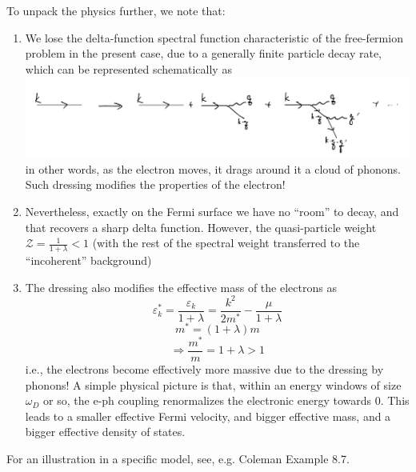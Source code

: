 To unpack the physics further, we note that:
\begin{enumerate}
    \item We lose the delta-function spectral function characteristic of the free-fermion problem in the present case, due to a generally finite particle decay rate, which can be represented schematically as
    \includegraphics[width=\textwidth]{jupyterbook/data/fig/lec24-fig04.png}
    in other words, as the electron moves, it drags around it a cloud of phonons. Such dressing modifies the properties of the electron!
    \item Nevertheless, exactly on the Fermi surface we have no ``room'' to decay, and that recovers a sharp delta function. However, the quasi-particle weight $\mathcal{Z}=\frac{1}{1+\lambda}<1$ (with the rest of the spectral weight transferred to the ``incoherent'' background)
    \item The dressing also modifies the effective mass of the electrons as
    \[ \varepsilon _{k}^{*}=\frac{\varepsilon _k}{1+\lambda}=\frac{k^2}{2m^*}-\frac{\mu}{1+\lambda}\]
    \[ m^*=\left( 1+\lambda \right) m\]
    \[ \Rightarrow \frac{m^*}{m}=1+\lambda >1\]
    i.e., the electrons become effectively more massive due to the dressing by phonons! A simple physical picture is that, within an energy windows of size $\omega_D$ or so, the e-ph coupling renormalizes the electronic energy towards $0$. This leads to a smaller effective Fermi velocity, and bigger effective mass, and a bigger effective density of states.
\end{enumerate}

For an illustration in a specific model, see, e.g. Coleman Example 8.7.
